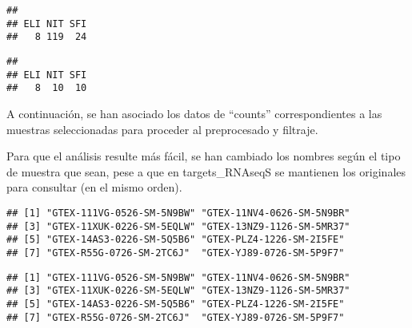 \documentclass[
]{article}
\newenvironment{Shaded}{\begin{snugshade}}{\end{snugshade}}
\newcommand{\DecValTok}[1]{\textcolor[rgb]{0.00,0.00,0.81}{#1}}
\newcommand{\KeywordTok}[1]{\textcolor[rgb]{0.13,0.29,0.53}{\textbf{#1}}}
\newcommand{\NormalTok}[1]{#1}
\newcommand{\OperatorTok}[1]{\textcolor[rgb]{0.81,0.36,0.00}{\textbf{#1}}}
\newcommand{\StringTok}[1]{\textcolor[rgb]{0.31,0.60,0.02}{#1}}
\begin{document}
\begin{verbatim}
## 
## ELI NIT SFI 
##   8 119  24
\end{verbatim}

\begin{Shaded}
\end{Shaded}

\begin{verbatim}
## 
## ELI NIT SFI 
##   8  10  10
\end{verbatim}

A continuación, se han asociado los datos de ``counts'' correspondientes
a las muestras seleccionadas para proceder al preprocesado y filtraje.

Para que el análisis resulte más fácil, se han cambiado los nombres
según el tipo de muestra que sean, pese a que en targets\_RNAseqS se
mantienen los originales para consultar (en el mismo orden).

\begin{verbatim}
## [1] "GTEX-111VG-0526-SM-5N9BW" "GTEX-11NV4-0626-SM-5N9BR"
## [3] "GTEX-11XUK-0226-SM-5EQLW" "GTEX-13NZ9-1126-SM-5MR37"
## [5] "GTEX-14AS3-0226-SM-5Q5B6" "GTEX-PLZ4-1226-SM-2I5FE" 
## [7] "GTEX-R55G-0726-SM-2TC6J"  "GTEX-YJ89-0726-SM-5P9F7"
\end{verbatim}

\begin{verbatim}
## [1] "GTEX-111VG-0526-SM-5N9BW" "GTEX-11NV4-0626-SM-5N9BR"
## [3] "GTEX-11XUK-0226-SM-5EQLW" "GTEX-13NZ9-1126-SM-5MR37"
## [5] "GTEX-14AS3-0226-SM-5Q5B6" "GTEX-PLZ4-1226-SM-2I5FE" 
## [7] "GTEX-R55G-0726-SM-2TC6J"  "GTEX-YJ89-0726-SM-5P9F7"
\end{verbatim}
\end{document}
